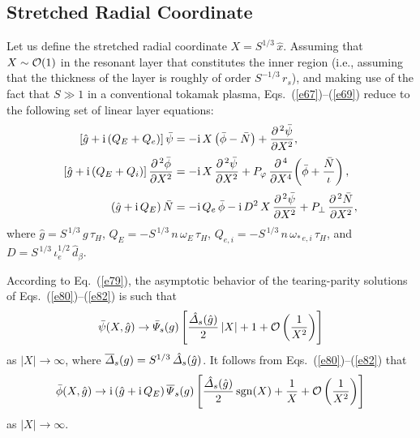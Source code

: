 \documentclass[12pt,prb,aps]{revtex4-1}
\begin{document}
\subsection{Stretched Radial Coordinate}
Let us define the stretched radial coordinate $X = S^{1/3}\,\hat{x}$.
Assuming that $X\sim{\cal O}(1)$ in the resonant layer that constitutes the inner region (i.e., assuming that the thickness of the layer is roughly of order $S^{-1/3}\,r_s$),
and making use of the fact that $S\gg 1$ in a conventional tokamak plasma,  Eqs.~(\ref{e67})--(\ref{e69}) reduce to the following
set of linear layer equations:
\begin{align}\label{e80}
\left[\hat{g}+{\rm i}\,(Q_E+Q_{e})\right]\bar{\psi}&= - {\rm i}\,X\left(\bar{\phi}-\bar{N}\right) + \frac{\partial^{\,2}\bar{\psi}}{\partial X^2},\\[0.5ex]
\left[\hat{g}+{\rm i}\,(Q_E +Q_{i})\right]\frac{\partial^{\,2}\bar{\phi}}{\partial X^2}&= - {\rm i}\,X\,\frac{\partial^{\,2}\bar{\psi}}{\partial X^2}+ P_\varphi\,\frac{\partial^{\,4}}{\partial X^4}\!\left(\bar{\phi} + \frac{\bar{N}}{\iota}\right),\\[0.5ex]
\left(\hat{g}+{\rm i}\,Q_E\right)\bar{N} &= - {\rm i}\,Q_{e}\,\bar{\phi}  - {\rm i} \,D^{2}\,X\,\frac{\partial^{\,2}\bar{\psi}}{\partial X^{2}}
+ P_\perp\,\frac{\partial^{\,2} \bar{N}}{\partial X^{2}},\label{e82}
\end{align}
where
$\hat{g}=S^{\,1/3}\,g\,\tau_H$,
$Q_E = -S^{\,1/3}\,n\,\omega_E\,\tau_H$, $Q_{e,i} = -S^{\,1/3}\,n\,\omega_{\ast\,e,i}\,\tau_H$,
and $D = S^{\,1/3}\,\iota_e^{1/2}\,\hat{d}_\beta$.  

According to Eq.~(\ref{e79}), the asymptotic behavior of the tearing-parity solutions of Eqs.~(\ref{e80})--(\ref{e82}) is
such that
\begin{equation}\label{e47}
\bar{\psi}(X,\hat{g})\rightarrow  \bar{\mit\Psi}_s(g)\left[\frac{\hat{\mit\Delta}_s(\hat{g})}{2}\,|X| +1 + {\cal O}\left(\frac{1}{X^2}\right)\right]
\end{equation}
as $|X|\rightarrow\infty$, where
$\overline{\mit\Delta}_s(g) = S^{1/3}\,\hat{\mit\Delta}_s(\hat{g})$.
It follows from Eqs.~(\ref{e80})--(\ref{e82}) that
\begin{equation}\label{e85}
\bar{\phi}(X,\hat{g})\rightarrow {\rm i}\,(\hat{g}+{\rm i}\,Q_E)\,\overline{\mit\Psi}_s(g)\left[ \frac{\hat{\mit\Delta}_s(\hat{g})}{2}\,{\rm sgn}(X)+ \frac{1}{X}+ {\cal O}\left(\frac{1}{X^2}\right)\right]
\end{equation}
as $|X|\rightarrow\infty$. 
\end{document}
